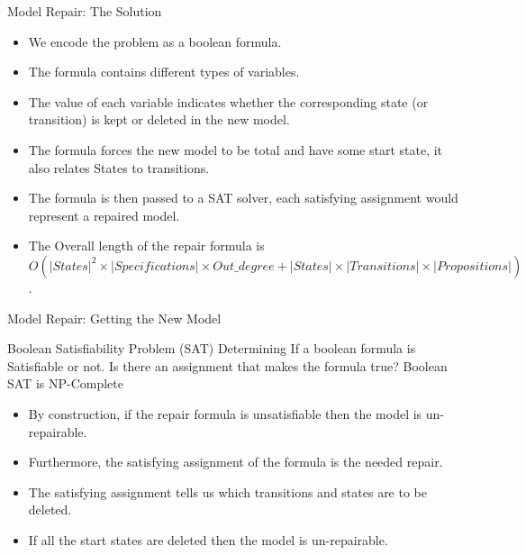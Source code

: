 \documentclass{bredelebeamer}
\begin{document}
\begin{frame}{Model Repair: The Solution}  %
\begin{itemize}
\item We encode the problem as a boolean formula.
\item The formula contains different types of variables.
\item The value of each variable indicates whether the corresponding state (or transition) is kept or deleted in the new model.
\item The formula forces the new model to be total and have some start state, it also relates States to transitions.
\item The formula is then passed to a SAT solver, each satisfying assignment would represent a repaired model.
\item The Overall length of the repair formula is \emph{$O(|States|^2 \times |Specifications| \times Out\_degree + |States| \times |Transitions| \times |Propositions|)$}\citep{paper}.
\end{itemize}
\end{frame}
\begin{frame}{Model Repair: Getting the New Model } %
\vspace{-5mm}
\hspace{-5mm}
\begin{block}{Boolean Satisfiability Problem (SAT)}
Determining If a boolean formula is Satisfiable or not. Is there an assignment that makes the formula true? Boolean SAT is NP-Complete
\end{block}
\vspace{5mm}
\begin{itemize}
\item By construction, if the repair formula is unsatisfiable then the model is un-repairable.
\item Furthermore, the satisfying assignment of the formula is the needed repair.
\item The satisfying assignment tells us which transitions and states are to be deleted.
\item If all the start states are deleted then the model is un-repairable.
\end{itemize}
\end{frame}

\end{document}

